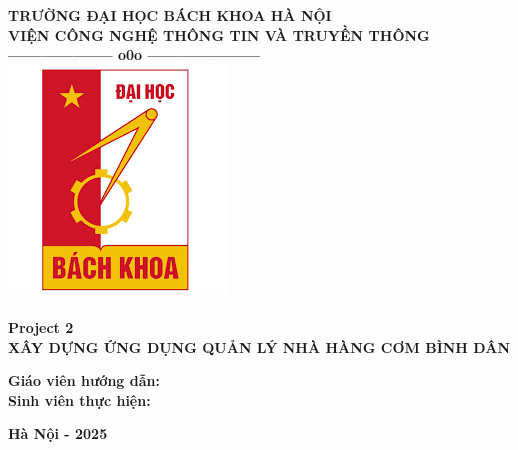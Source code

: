 \documentclass[12pt]{extreport}
\begin{document}
\thispagestyle{empty}
\thisfancypage{
	\setlength{\fboxsep}{0pt}
	\fbox}{}

\begin{center}
	
	{\fontsize{13pt}{1}\selectfont\textbf{TRƯỜNG ĐẠI HỌC BÁCH KHOA HÀ NỘI}}
	\\
	{\fontsize{13pt}{1}\selectfont\textbf{VIỆN CÔNG NGHỆ THÔNG TIN VÀ TRUYỀN THÔNG}}
	\\		
	\textbf{--------------------  o0o  ---------------------}\\[1cm]
	\includegraphics[scale=0.5]{bk_logo.png} \\[1.2cm]
\textbf{}\\[1cm]
\textbf{{\large Project 2}}\\[0.2cm]
\textbf{{\large XÂY DỰNG ỨNG DỤNG QUẢN LÝ NHÀ HÀNG CƠM BÌNH DÂN}}
\end{center}
\begin{flushleft}
\hspace{1.5 cm} \textbf{ Giáo viên hướng dẫn:\hspace{0.2cm}{ Họ và tên giảng viên}}\\[0.2cm]
\hspace{1.5 cm} \textbf{ Sinh viên thực hiện\hspace{0.3cm}:}\\[0.2cm]
\end{flushleft}

\vfill
\begin{center}
\textbf{{\large Hà Nội - 2025}}\\
\end{center}
\end{document}
